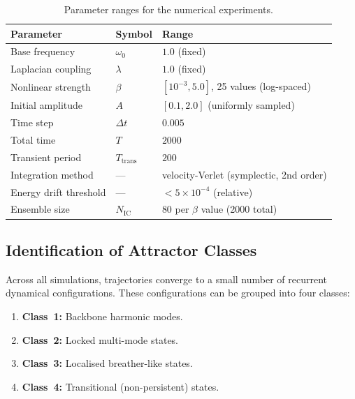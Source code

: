\documentclass[12pt,a4paper]{article}
\begin{document}
\begin{table}[H]
\centering
\caption{Parameter ranges for the numerical experiments.}
\label{tab:params}
\begin{tabular}{@{}lll@{}}
\toprule
Parameter & Symbol & Range \\
\midrule
Base frequency & $\omega_0$ & $1.0$ (fixed) \\
Laplacian coupling & $\lambda$ & $1.0$ (fixed) \\
Nonlinear strength & $\beta$ & $[10^{-3}, 5.0]$, 25 values (log-spaced) \\
Initial amplitude & $A$ & $[0.1, 2.0]$ (uniformly sampled) \\
Time step & $\Delta t$ & $0.005$ \\
Total time & $T$ & $2000$ \\
Transient period & $T_{\mathrm{trans}}$ & $200$ \\
Integration method & --- & velocity-Verlet (symplectic, 2nd order) \\
Energy drift threshold & --- & $< 5 \times 10^{-4}$ (relative) \\
Ensemble size & $N_{\mathrm{IC}}$ & $80$ per $\beta$ value (2000 total) \\
\bottomrule
\end{tabular}
\end{table}

\subsection{Identification of Attractor Classes}\label{sec:id_classes}

Across all simulations, trajectories converge to a small number of
recurrent dynamical configurations.  These configurations can be
grouped into four classes:

\begin{enumerate}[nosep]
\item \textbf{Class~1:} Backbone harmonic modes.
\item \textbf{Class~2:} Locked multi-mode states.
\item \textbf{Class~3:} Localised breather-like states.
\item \textbf{Class~4:} Transitional (non-persistent) states.
\end{enumerate}
\end{document}

